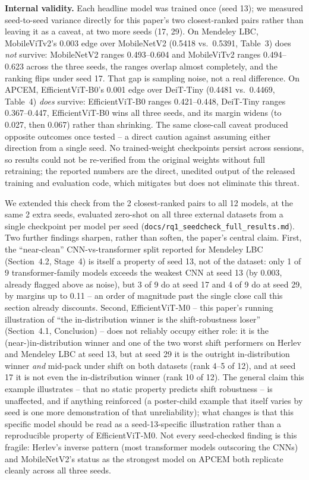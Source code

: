 \documentclass[runningheads]{llncs}
\begin{document}
\textbf{Internal validity.} Each headline model was trained once (seed
13); we measured seed-to-seed variance directly for this paper's two
closest-ranked pairs rather than leaving it as a caveat, at two more
seeds (17, 29). On Mendeley LBC, MobileViTv2's 0.003 edge over
MobileNetV2 (0.5418 vs.\ 0.5391, Table~3) does \emph{not} survive:
MobileNetV2 ranges 0.493--0.604 and MobileViTv2 ranges 0.494--0.623
across the three seeds, the ranges overlap almost completely, and the
ranking flips under seed 17. That gap is sampling noise, not a real
difference. On APCEM, EfficientViT-B0's 0.001 edge over DeiT-Tiny
(0.4481 vs.\ 0.4469, Table~4) \emph{does} survive: EfficientViT-B0 ranges
0.421--0.448, DeiT-Tiny ranges 0.367--0.447, EfficientViT-B0 wins all
three seeds, and its margin widens (to 0.027, then 0.067) rather than
shrinking. The same close-call caveat produced opposite outcomes once
tested -- a direct caution against assuming either direction from a
single seed. No trained-weight checkpoints persist across sessions, so
results could not be re-verified from the original weights without full
retraining; the reported numbers are the direct, unedited output of the
released training and evaluation code, which mitigates but does not
eliminate this threat.

We extended this check from the 2 closest-ranked pairs to all 12 models,
at the same 2 extra seeds, evaluated zero-shot on all three external
datasets from a single checkpoint per model per seed
(\texttt{docs/rq1\_seedcheck\_full\_results.md}). Two further findings
sharpen, rather than soften, the paper's central claim. First, the
``near-clean'' CNN-vs-transformer split reported for Mendeley LBC
(Section~4.2, Stage~4) is itself a property of seed 13, not of the
dataset: only 1 of 9 transformer-family models exceeds the weakest CNN at
seed 13 (by 0.003, already flagged above as noise), but 3 of 9 do at seed
17 and 4 of 9 do at seed 29, by margins up to 0.11 -- an order of
magnitude past the single close call this section already discounts.
Second, EfficientViT-M0 -- this paper's running illustration of ``the
in-distribution winner is the shift-robustness loser''
(Section~4.1, Conclusion) -- does not reliably occupy either role: it is
the (near-)in-distribution winner and one of the two worst shift
performers on Herlev and Mendeley LBC at seed 13, but at seed 29 it is the
outright in-distribution winner \emph{and} mid-pack under shift on both
datasets (rank 4--5 of 12), and at seed 17 it is not even the
in-distribution winner (rank 10 of 12). The general claim this example
illustrates -- that no static property predicts shift robustness -- is
unaffected, and if anything reinforced (a poster-child example that
itself varies by seed is one more demonstration of that unreliability);
what changes is that this specific model should be read as a
seed-13-specific illustration rather than a reproducible property of
EfficientViT-M0. Not every seed-checked finding is this fragile: Herlev's
inverse pattern (most transformer models outscoring the CNNs) and
MobileNetV2's status as the strongest model on APCEM both replicate
cleanly across all three seeds.
\end{document}
